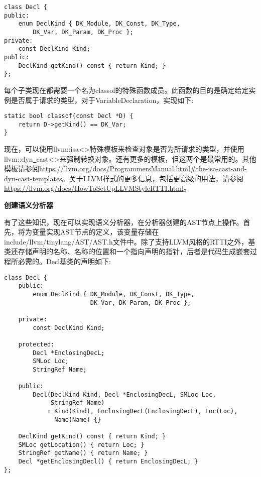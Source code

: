 \begin{lstlisting}[caption={}]
class Decl {
public:
	enum DeclKind { DK_Module, DK_Const, DK_Type,
		DK_Var, DK_Param, DK_Proc };
private:
	const DeclKind Kind;
public:
	DeclKind getKind() const { return Kind; }
};
\end{lstlisting}

每个子类现在都需要一个名为classof的特殊函数成员。此函数的目的是确定给定实例是否属于请求的类型，对于VariableDeclaration，实现如下:\par

\begin{lstlisting}[caption={}]
static bool classof(const Decl *D) {
	return D->getKind() == DK_Var;
}
\end{lstlisting}

现在，可以使用llvm::isa<>特殊模板来检查对象是否为所请求的类型，并使用llvm::dyn\underline{~}cast<>来强制转换对象。还有更多的模板，但这两个是最常用的。其他模板请参阅\url{https://llvm.org/docs/ProgrammersManual.html\#the-isa-cast-and-dyn-cast-templates}。关于LLVM样式的更多信息，包括更高级的用法，请参阅\url{https://llvm.org/docs/HowToSetUpLLVMStyleRTTI.html}。\par

\hspace*{\fill} \par %
\textbf{创建语义分析器}

有了这些知识，现在可以实现语义分析器，在分析器创建的AST节点上操作。首先，将为变量实现AST节点的定义，该变量存储在include/llvm/tinylang/AST/AST.h文件中。除了支持LLVM风格的RTTI之外，基类还存储声明的名称、名称的位置和一个指向声明的指针，后者是代码生成嵌套过程所必需的。Decl基类的声明如下:\par

\begin{lstlisting}[caption={}]
class Decl {
	public:
		enum DeclKind { DK_Module, DK_Const, DK_Type,
						DK_Var, DK_Param, DK_Proc };
	
	private:
		const DeclKind Kind;
		
	protected:
		Decl *EnclosingDecL;
		SMLoc Loc;
		StringRef Name;
		
	public:
		Decl(DeclKind Kind, Decl *EnclosingDecL, SMLoc Loc,
			 StringRef Name)
			: Kind(Kind), EnclosingDecL(EnclosingDecL), Loc(Loc),
			  Name(Name) {}
	
	DeclKind getKind() const { return Kind; }
	SMLoc getLocation() { return Loc; }
	StringRef getName() { return Name; }
	Decl *getEnclosingDecl() { return EnclosingDecL; }
};
\end{lstlisting}

